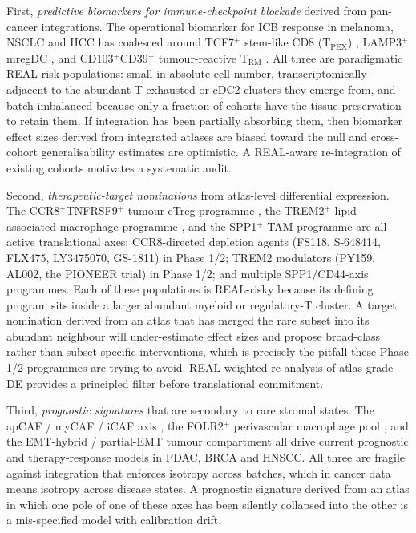 First, \emph{predictive biomarkers for immune-checkpoint blockade} derived from pan-cancer integrations. The operational biomarker for ICB response in melanoma, NSCLC and HCC has coalesced around TCF7$^+$ stem-like CD8 (T$_\text{PEX}$) \citep{Miller2019NatImmunol,Siddiqui2019Immunity,Sade-Feldman2018Cell}, LAMP3$^+$ mregDC \citep{Maier2020Nature}, and CD103$^+$CD39$^+$ tumour-reactive T$_\text{RM}$ \citep{Duhen2018NatCommun,Oliveira2021Nature}. All three are paradigmatic REAL-risk populations: small in absolute cell number, transcriptomically adjacent to the abundant T-exhausted or cDC2 clusters they emerge from, and batch-imbalanced because only a fraction of cohorts have the tissue preservation to retain them. If integration has been partially absorbing them, then biomarker effect sizes derived from integrated atlases are biased toward the null and cross-cohort generalisability estimates are optimistic. A REAL-aware re-integration of existing cohorts motivates a systematic audit.

Second, \emph{therapeutic-target nominations} from atlas-level differential expression. The CCR8$^+$TNFRSF9$^+$ tumour eTreg programme \citep{Plitas2016Immunity,DeSimone2016Immunity,Wang2019Cell}, the TREM2$^+$ lipid-associated-macrophage programme \citep{Molgora2020Cell,Sharma2020Cell}, and the SPP1$^+$ TAM programme \citep{Zhang2020Cell} are all active translational axes: CCR8-directed depletion agents (FS118, S-648414, FLX475, LY3475070, GS-1811) in Phase 1/2; TREM2 modulators (PY159, AL002, the PIONEER trial) in Phase 1/2; and multiple SPP1/CD44-axis programmes. Each of these populations is REAL-risky because its defining program sits inside a larger abundant myeloid or regulatory-T cluster. A target nomination derived from an atlas that has merged the rare subset into its abundant neighbour will under-estimate effect sizes and propose broad-class rather than subset-specific interventions, which is precisely the pitfall these Phase 1/2 programmes are trying to avoid. REAL-weighted re-analysis of atlas-grade DE provides a principled filter before translational commitment.

Third, \emph{prognostic signatures} that are secondary to rare stromal states. The apCAF / myCAF / iCAF axis \citep{Elyada2019CancerDiscov,Cords2023NatCommun,Ohlund2017JEM}, the FOLR2$^+$ perivascular macrophage pool \citep{NalioRamos2022Cell,Bill2023Science}, and the EMT-hybrid / partial-EMT tumour compartment \citep{Puram2017Cell,ChanSengYue2020NatGenet} all drive current prognostic and therapy-response models in PDAC, BRCA and HNSCC. All three are fragile against integration that enforces isotropy across batches, which in cancer data means isotropy across disease states. A prognostic signature derived from an atlas in which one pole of one of these axes has been silently collapsed into the other is a mis-specified model with calibration drift.

